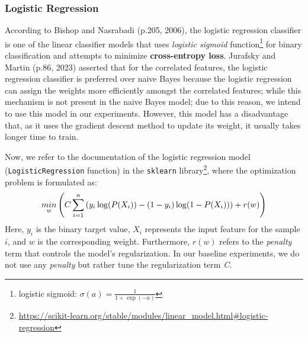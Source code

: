 \documentclass[11pt]{article}
\begin{document}
\subsubsection{Logistic Regression}
According to Bishop and Nasrabadi (p.205, 2006), the logistic regression classifier is one of the linear classifier models that uses \textit{logistic sigmoid} function\footnote{logistic sigmoid: $\sigma(a)=\frac{1}{1+\exp{(-a)}}$} for binary classification and attempts to minimize \textbf{cross-entropy loss}. 
Jurafsky and Martin (p.86, 2023)
asserted that for the correlated features, the logistic regression classifier is preferred over naive Bayes because the logistic regression can assign the weights more efficiently amongst the correlated features; while this mechanism is not present in the naive Bayes model; due to this reason, we intend to use this model in our experiments. However, this model has a disadvantage that, as it uses the gradient descent method to update its weight, it usually takes longer time to train.

Now, we refer to the documentation of the logistic regression model (\texttt{LogisticRegression} function) in the \texttt{sklearn} library\footnote{\url{https://scikit-learn.org/stable/modules/linear_model.html\#logistic-regression}}, where the optimization problem is formulated as:
\begin{equation}
\label{eq:lr}
\scriptsize \underset{w}{min}\left( C\sum_{i=1}^n \left(y_i \log(P(X_i)) - (1-y_i) \log(1-P(X_i))\right)  + r(w)  \right)
\end{equation}
Here, $y_i$ is the binary target value, $X_i$ represents the input feature for the sample $i$, and $w$ is the corresponding weight. Furthermore, $r(w)$ refers to the \textit{penalty} term that controls the model's regularization. In our baseline experiments, we do not use any \textit{penalty} but rather tune the regularization term \textit{C}.
\end{document}
